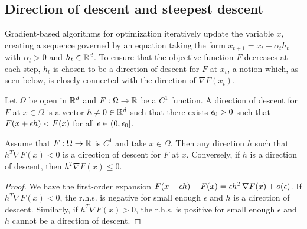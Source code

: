 
\subsection{Direction of descent and steepest descent}
Gradient-based algorithms for optimization iteratively update the variable $x$, creating a sequence governed by an equation taking the form $x_{t+1} = x_t + \alpha_t h_t$ with $\alpha_t > 0$ and $h_t \in {\mathbb{R}}^d$. To ensure that the objective function $F$ decreases at each step, $h_t$ is chosen to be a direction of descent for $F$ at $x_t$, a notion which, as seen below, is closely connected with the direction of $\nabla F(x_t)$.

\begin{definition}
\label{def:dir.desc}
 Let $\Omega$ be open in ${\mathbb{R}}^d$ and $F:\Omega  \to {\mathbb{R}}$  be a $C^1$ function. A direction of descent for $F$ at $x\in\Omega$ is a vector $h\neq 0 \in{\mathbb{R}}^d$ such that there exists $\epsilon_0>0$ such that $F(x+\epsilon h) < F(x)$ for all $\epsilon\in (0, \epsilon_0]$.  
 \end{definition}

\begin{proposition}
\label{prop:dir.desc}
Assume that $F: \Omega\to {\mathbb{R}}$  is  $C^1$ and take $x\in \Omega$. Then any direction $h$ such that $h^T\nabla F(x) < 0$ is a direction of descent for $F$ at $x$. Conversely, if $h$ is a direction of descent, then $h^T\nabla F(x) \leq 0$.
\end{proposition}
\begin{proof}
We have the first-order expansion $F(x+ \epsilon h) - F(x) = \epsilon h^T\nabla F(x) + o(\epsilon)$. If $h^T\nabla F(x) < 0$, the r.h.s. is negative for small enough $\epsilon$ and $h$ is a direction of descent. Similarly, if $h^T\nabla F(x) > 0$, the r.h.s. is positive for small enough $\epsilon$ and $h$ cannot be a direction of descent. 
\end{proof}

